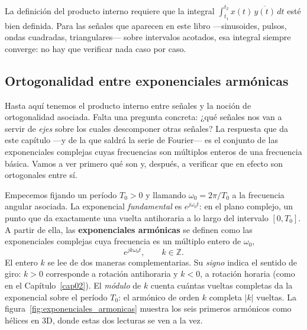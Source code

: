 \documentclass[class=book, crop=false]{standalone}
\begin{document}
\begin{nota}
La definición del producto interno requiere que la integral
$\int_{t_1}^{t_2} x(t)\,\overline{y(t)}\,dt$ esté bien definida. Para
las señales que aparecen en este libro —sinusoides, pulsos, ondas
cuadradas, triangulares— sobre intervalos acotados, esa integral
siempre converge: no hay que verificar nada caso por caso.
\end{nota}

\subsection{Ortogonalidad entre exponenciales armónicas}
\label{subsec:ortogonalidad_sinusoides}

Hasta aquí tenemos el producto interno entre señales y la noción de
ortogonalidad asociada. Falta una pregunta concreta: ¿qué señales nos
van a servir de \emph{ejes} sobre los cuales descomponer otras señales?
La respuesta que da este capítulo —y de la que saldrá la serie de
Fourier— es el conjunto de las exponenciales complejas cuyas
frecuencias son múltiplos enteros de una frecuencia básica. Vamos a
ver primero qué son y, después, a verificar que en efecto son
ortogonales entre sí.

Empecemos fijando un período $T_0 > 0$ y llamando
$\omega_0 = 2\pi/T_0$ a la frecuencia angular asociada. La exponencial
\emph{fundamental} es $e^{j\omega_0 t}$: en el plano complejo, un
punto que da exactamente una vuelta antihoraria a lo largo del
intervalo $[0, T_0]$. A partir de ella, las \textbf{exponenciales
armónicas} se definen como las exponenciales complejas cuya frecuencia
es un múltiplo entero de $\omega_0$,
\begin{equation*}
    e^{jk\omega_0 t}, \qquad k \in \mathbb{Z}.
\end{equation*}
El entero $k$ se lee de dos maneras complementarias. Su \emph{signo}
indica el sentido de giro: $k > 0$ corresponde a rotación antihoraria
y $k < 0$, a rotación horaria (como en el Capítulo~\ref{cap02}). El
\emph{módulo} de $k$ cuenta cuántas vueltas completas da la exponencial sobre
el período $T_0$: el armónico de orden $k$ completa $|k|$ vueltas. La
figura~\ref{fig:exponenciales_armonicas} muestra los seis primeros
armónicos como hélices en 3D, donde estas dos lecturas se ven a la vez.
\end{document}

